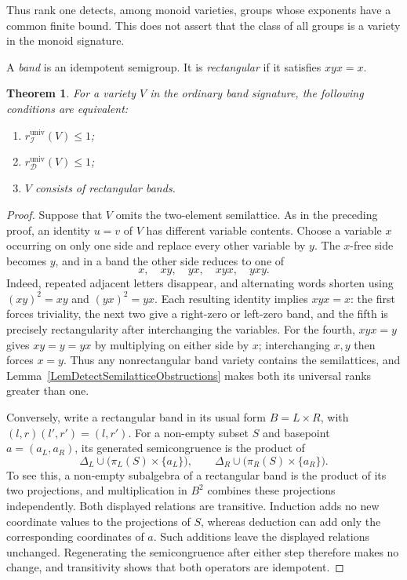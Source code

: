 \documentclass[12pt,english]{amsart}
\newtheorem{theorem}{Theorem}[section]
\theoremstyle{definition}
\numberwithin{equation}{section}
\theoremstyle{remark}
\begin{document}
Thus rank one detects, among monoid varieties, groups whose
exponents have a common finite bound. This does not assert that
the class of all groups is a variety in the monoid signature.

A \emph{band} is an idempotent semigroup. It is \emph{rectangular}
if it satisfies $xyx=x$.

\begin{theorem}\label{ThmDetectBandRank}
For a variety $V$ in the ordinary band signature, the following
conditions are equivalent:
\begin{enumerate}
\item $r_{\mathcal I}^{\mathrm{univ}}(V)\leqslant1$;
\item $r_{\mathcal D}^{\mathrm{univ}}(V)\leqslant1$;
\item $V$ consists of rectangular bands.
\end{enumerate}
\end{theorem}

\begin{proof}
Suppose that $V$ omits the two-element semilattice. As in the
preceding proof, an identity $u=v$ of $V$ has different variable
contents. Choose a variable $x$ occurring on only one side and
replace every other variable by $y$. The $x$-free side becomes
$y$, and in a band the other side reduces to one of
\[
x,\quad xy,\quad yx,\quad xyx,\quad yxy.
\]
Indeed, repeated adjacent letters disappear, and alternating
words shorten using $(xy)^2=xy$ and $(yx)^2=yx$.
Each resulting identity implies $xyx=x$: the first forces
triviality, the next two give a right-zero or left-zero band,
and the fifth is precisely rectangularity after interchanging the
variables. For the fourth, $xyx=y$ gives $xy=y=yx$ by multiplying
on either side by $x$; interchanging $x,y$ then forces $x=y$. Thus any
nonrectangular band variety contains the semilattices, and
Lemma~\ref{LemDetectSemilatticeObstructions} makes both its
universal ranks greater than one.

Conversely, write a rectangular band in its usual form
$B=L\times R$, with
$(l,r)(l',r')=(l,r')$. For a non-empty subset $S$ and basepoint
$a=(a_L,a_R)$, its generated semicongruence is the product of
\[
\Delta_L\cup\bigl(\pi_L(S)\times\{a_L\}\bigr),
\qquad
\Delta_R\cup\bigl(\pi_R(S)\times\{a_R\}\bigr).
\]
To see this, a non-empty subalgebra of a rectangular band is the
product of its two projections, and multiplication in $B^2$
combines these projections independently. Both displayed
relations are transitive. Induction adds no new coordinate values
to the projections of $S$, whereas deduction can add only the
corresponding coordinates of $a$. Such additions leave the
displayed relations unchanged. Regenerating the semicongruence
after either step therefore makes no change, and transitivity
shows that both operators are idempotent.
\end{proof}
\end{document}
